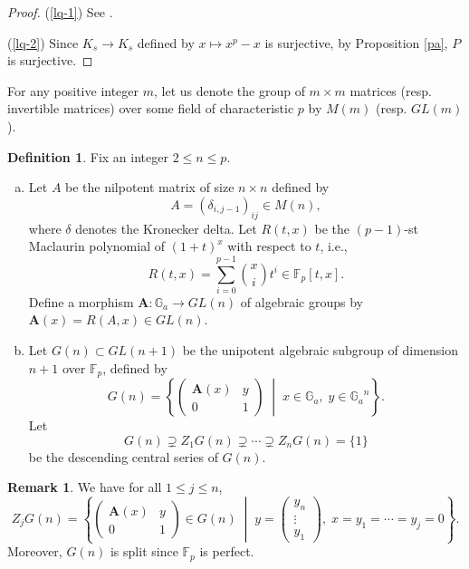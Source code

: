 \documentclass[sn-mathphys-num]{sn-jnl}
\numberwithin{equation}{section}
\theoremstyle{plain}
\theoremstyle{definition}
\newtheorem{defi}[theo]{Definition}
\newtheorem{rema}[theo]{Remark}
\begin{document}
\begin{proof}
  (\ref{lq-1}) See \cite{Ng}.




(\ref{lq-2}) Since $K_s\to K_s$ defined by $x\mapsto x^p-x$ is surjective, by Proposition \ref{pa}, $P$ is surjective.
\end{proof}
For any positive integer $m$, let us denote the group of $m\times m$ matrices (resp. invertible matrices) over some field of characteristic $p$ by $M(m)$ (resp. $GL(m)$). 
\begin{defi}\label{dfb}
  Fix an integer $2\leq n\leq p$.
  \begin{enumerate}[(a)]
    \item\label{dfb-1} Let $A$ be the nilpotent matrix of size $n\times n$ defined by
\begin{equation}
A=\left(\delta_{i,j-1}\right)_{ij}\in M(n),
\end{equation}
where $\delta$ denotes the Kronecker delta. Let $R(t,x)$ be the $(p-1)$-st Maclaurin polynomial of $(1+t)^x$ with respect to $t$, i.e.,
\begin{equation}
R(t,x)=\sum_{i=0}^{p-1}\binom{x}{i}t^i\in\mathbb{F}_p[t,x].
\end{equation}
Define a morphism $\mathbf{A}:\mathbb{G}_a\to GL(n)$ of algebraic groups by $\mathbf{A}(x)=R(A,x)\in GL(n)$.
\item\label{dfb-2}
Let $G(n)\subset GL(n+1)$ be the unipotent algebraic subgroup of dimension $n+1$ over $\mathbb{F}_p$, defined by
\begin{equation}
G(n)=\left\{
\begin{pmatrix}
  \mathbf{A}(x)&y\\
  0&1
\end{pmatrix}\;
\middle|\;x\in \mathbb{G}_a,\;y\in {\mathbb{G}_a}^n\right\}.
\end{equation}
Let
\begin{equation}
G(n)\supsetneq Z_1G(n)\supsetneq\cdots\supsetneq Z_nG(n)=\{1\}
\end{equation}
be the descending central series of $G(n)$.
\end{enumerate}
\end{defi}

\begin{rema}
We have for all $1\leq j\leq n$, 
\begin{equation}
Z_jG(n)=\left\{
  \begin{pmatrix}
  \mathbf{A}(x)&y\\
  0&1
  \end{pmatrix}\in G(n)\;\middle|
  \;y=\begin{pmatrix}
  y_n\\
  \vdots\\
  y_1
  \end{pmatrix},\;
  x=y_1=\cdots=y_j=0
\right\}.
\end{equation}
Moreover, $G(n)$ is split since $\mathbb{F}_p$ is perfect.
\end{rema}
\end{document}
